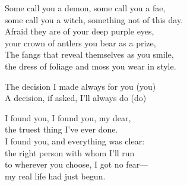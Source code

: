\begin{lyrics}
Some call you a demon, some call you a fae,\\
some call you a witch, something not of this day.\\
Afraid they are of your deep purple eyes,\\
your crown of antlers you bear as a prize,\\
The fangs that reveal themselves as you smile,\\
the dress of foliage and moss you wear in style.

The decision I made always for you (you)\\
A decision, if asked, I'll always do (do)

I found you, I found you, my dear,\\
the truest thing I've ever done.\\
I found you, and everything was clear:\\
the right person with whom I'll run\\
to wherever you choose, I got no fear—\\
my real life had just begun.
\end{lyrics}

